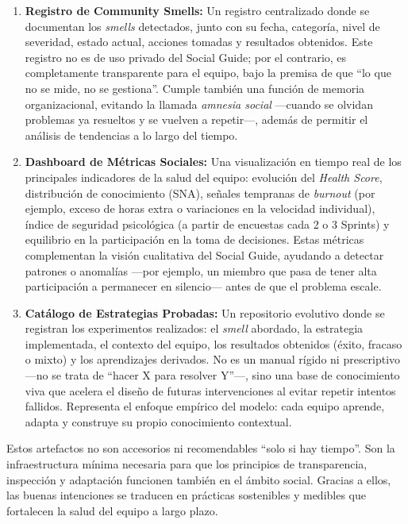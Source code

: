 \begin{enumerate}
    \item \textbf{Registro de Community Smells:}
          Un registro centralizado donde se documentan los \textit{smells} detectados, junto con su fecha, categoría, nivel de severidad, estado actual, acciones tomadas y resultados obtenidos.
          Este registro no es de uso privado del Social Guide; por el contrario, es completamente transparente para el equipo, bajo la premisa de que ``lo que no se mide, no se gestiona''.
          Cumple también una función de memoria organizacional, evitando la llamada \textit{amnesia social} —cuando se olvidan problemas ya resueltos y se vuelven a repetir—, además de permitir el análisis de tendencias a lo largo del tiempo.

    \item \textbf{Dashboard de Métricas Sociales:}
          Una visualización en tiempo real de los principales indicadores de la salud del equipo: evolución del \textit{Health Score}, distribución de conocimiento (SNA), señales tempranas de \textit{burnout} (por ejemplo, exceso de horas extra o variaciones en la velocidad individual), índice de seguridad psicológica (a partir de encuestas cada 2 o 3 Sprints) y equilibrio en la participación en la toma de decisiones.
          Estas métricas complementan la visión cualitativa del Social Guide, ayudando a detectar patrones o anomalías —por ejemplo, un miembro que pasa de tener alta participación a permanecer en silencio— antes de que el problema escale.

    \item \textbf{Catálogo de Estrategias Probadas:}
          Un repositorio evolutivo donde se registran los experimentos realizados: el \textit{smell} abordado, la estrategia implementada, el contexto del equipo, los resultados obtenidos (éxito, fracaso o mixto) y los aprendizajes derivados.
          No es un manual rígido ni prescriptivo —no se trata de ``hacer X para resolver Y''—, sino una base de conocimiento viva que acelera el diseño de futuras intervenciones al evitar repetir intentos fallidos.
          Representa el enfoque empírico del modelo: cada equipo aprende, adapta y construye su propio conocimiento contextual.


\end{enumerate}

Estos artefactos no son accesorios ni recomendables ``solo si hay tiempo''. Son la infraestructura mínima necesaria para que los principios de transparencia, inspección y adaptación funcionen también en el ámbito social.
Gracias a ellos, las buenas intenciones se traducen en prácticas sostenibles y medibles que fortalecen la salud del equipo a largo plazo.

